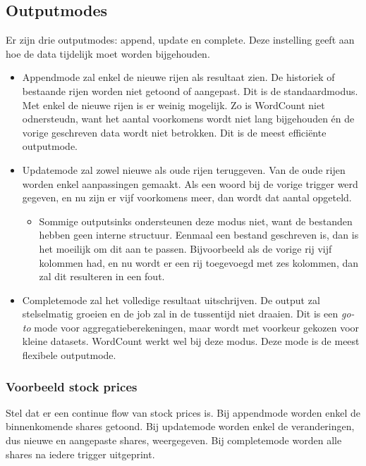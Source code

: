 \documentclass[a4paper,10pt,twoside]{report}
\begin{document}
\subsection{Outputmodes}

Er zijn drie outputmodes: append, update en complete. Deze instelling geeft aan hoe de data tijdelijk moet worden bijgehouden.

\begin{itemize}
	\item Appendmode zal enkel de nieuwe rijen als resultaat zien. De historiek of bestaande rijen worden niet getoond of aangepast. Dit is de standaardmodus. Met enkel de nieuwe rijen is er weinig mogelijk. Zo is WordCount niet odnersteudn, want het aantal voorkomens wordt niet lang bijgehouden én de vorige geschreven data wordt niet betrokken. Dit is de meest efficiënte outputmode.
	\item Updatemode zal zowel nieuwe als oude rijen teruggeven. Van de oude rijen worden enkel aanpassingen gemaakt. Als een woord bij de vorige trigger werd gegeven, en nu zijn er vijf voorkomens meer, dan wordt dat aantal opgeteld. 
	\begin{itemize}
		\item Sommige outputsinks ondersteunen deze modus niet, want de bestanden hebben geen interne structuur. Eenmaal een bestand geschreven is, dan is het moeilijk om dit aan te passen. Bijvoorbeeld als de vorige rij vijf kolommen had, en nu wordt er een rij toegevoegd met zes kolommen, dan zal dit resulteren in een fout.
	\end{itemize}
	\item Completemode zal het volledige resultaat uitschrijven. De output zal stelselmatig groeien en de job zal in de tussentijd niet draaien. Dit is een \textit{go-to} mode voor aggregatieberekeningen, maar wordt met voorkeur gekozen voor kleine datasets. WordCount werkt wel bij deze modus. Deze mode is de meest flexibele outputmode.
\end{itemize}

\subsubsection{Voorbeeld stock prices}

Stel dat er een continue flow van stock prices is. Bij appendmode worden enkel de binnenkomende shares getoond. Bij updatemode worden enkel de veranderingen, dus nieuwe en aangepaste shares, weergegeven. Bij completemode worden alle shares na iedere trigger uitgeprint.
\end{document}
